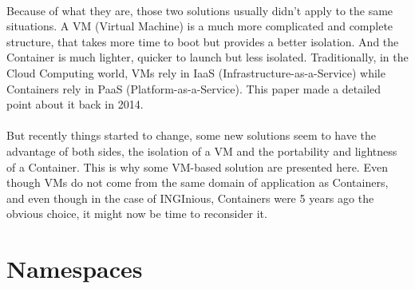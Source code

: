 \paragraph{}Because of what they are, those two solutions usually didn't apply to the same situations.  A VM (Virtual Machine) is a much more complicated and complete structure, that takes more time to boot but provides a better isolation.  And the Container is much lighter, quicker to launch but less isolated.  Traditionally, in the Cloud Computing world, VMs rely in IaaS (Infrastructure-as-a-Service) while Containers rely in PaaS (Platform-as-a-Service).  This paper \cite{dua2014virtualization} made a detailed point about it back in 2014.

\paragraph{}But recently things started to change, some new solutions seem to have the advantage of both sides, the isolation of a VM and the portability and lightness of a Container.  This is why some VM-based solution are presented here.  Even though VMs do not come from the same domain of application as Containers, and even though in the case of INGInious, Containers were 5 years ago the obvious choice, it might now be time to reconsider it.

\section{Namespaces}
